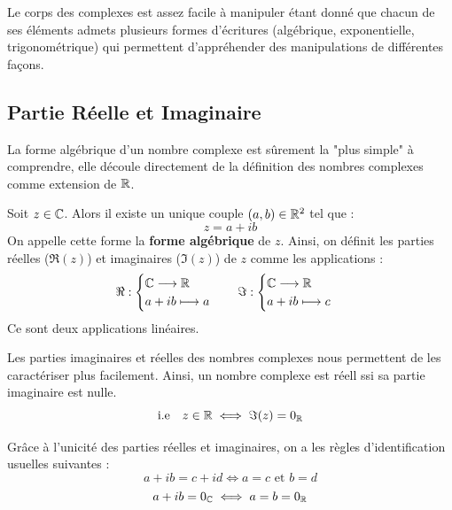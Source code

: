 Le corps des complexes est assez facile à manipuler étant donné que chacun de ses éléments admets plusieurs formes 
d'écritures (algébrique, exponentielle, trigonométrique) qui permettent d'appréhender des manipulations de différentes 
façons. 

\subsection{Partie Réelle et Imaginaire}

La forme algébrique d'un nombre complexe est sûrement la "plus simple" à comprendre, elle découle directement de 
la définition des nombres complexes comme extension de $\mathbb{R}$. 

\newpage

\begin{definition}
    Soit $z \in \mathbb{C}$. Alors il existe un unique couple $(a,b) \in \mathbb{R}^2$ tel que : 
        \[ z = a + ib \] 
    On appelle cette forme la \textbf{forme algébrique} de $z$. 
    Ainsi, on définit les parties réelles ($ \Re (z)$) et imaginaires ($ \Im (z)$) de $z$ comme les applications : 
        \[ \Re : 
            \begin{cases}
                \mathbb{C} \longrightarrow \mathbb{R} \\ 
                a + ib \longmapsto a 
            \end{cases}
        \quad \Im : 
            \begin{cases}
                \mathbb{C} \longrightarrow \mathbb{R} \\ 
                a + ib \longmapsto c 
            \end{cases} \] 
    Ce sont deux applications linéaires. 
\end{definition}

\begin{proposition}
    Les parties imaginaires et réelles des nombres complexes nous permettent de les caractériser plus facilement. 
    Ainsi, un nombre complexe est réell ssi sa partie imaginaire est nulle. 
        \[ \text{i.e} \quad z \in \mathbb{R} \iff \Im (z) = 0_{\mathbb{R}} \] 
\end{proposition}

\begin{remark}
    Grâce à l'unicité des parties réelles et imaginaires, on a les règles d'identification usuelles suivantes : 
        \[ a+ ib = c + id \iff a = c \text{ et } b = d \] 
        \[ a+ ib = 0_{\mathbb{C}} \iff a = b = 0_{\mathbb{R}} \] 
\end{remark}


